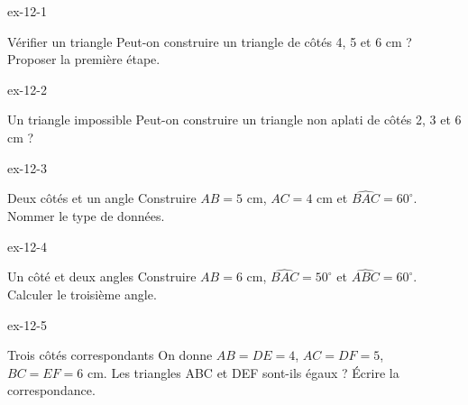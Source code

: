 \clearpage{}
\begin{blocLivre}{ex-12-1}\begin{exercice}[1]{Vérifier un triangle}
Peut-on construire un triangle de côtés 4, 5 et 6 cm ? Proposer la première étape.
\label{fig-ex-12-1}
\end{exercice}\end{blocLivre}
\begin{blocLivre}{ex-12-2}\begin{exercice}[1]{Un triangle impossible}
Peut-on construire un triangle non aplati de côtés 2, 3 et 6 cm ?
\label{fig-ex-12-2}
\end{exercice}\end{blocLivre}
\begin{blocLivre}{ex-12-3}\begin{exercice}[1]{Deux côtés et un angle}
Construire $AB=5$ cm, $AC=4$ cm et $\widehat{BAC}=60^\circ$. Nommer le type de données.
\label{fig-ex-12-3}
\end{exercice}\end{blocLivre}
\begin{blocLivre}{ex-12-4}\begin{exercice}[1]{Un côté et deux angles}
Construire $AB=6$ cm, $\widehat{BAC}=50^\circ$ et $\widehat{ABC}=60^\circ$. Calculer le troisième angle.
\label{fig-ex-12-4}
\end{exercice}\end{blocLivre}
\begin{blocLivre}{ex-12-5}\begin{exercice}[1]{Trois côtés correspondants}
On donne $AB=DE=4$, $AC=DF=5$, $BC=EF=6$ cm. Les triangles ABC et DEF sont-ils égaux ? Écrire la correspondance.
\label{fig-ex-12-5}
\end{exercice}\end{blocLivre}

